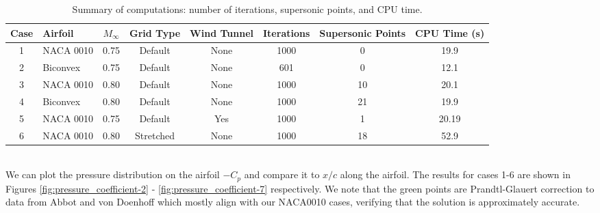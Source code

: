 \documentclass[12pt]{article}
\theoremstyle{definition}
\begin{document}
\begin{table}[h]
    \centering
    \begin{tabular}{c l c c c c c c}
        \hline
        Case & Airfoil & $M_\infty$ & Grid Type & Wind Tunnel & Iterations & Supersonic Points & CPU Time (s) \\
        \hline
        1 & NACA 0010 & 0.75 & Default & None & 1000 & 0 & 19.9 \\
        2 & Biconvex & 0.75 & Default & None & 601 & 0 & 12.1 \\
        3 & NACA 0010 & 0.80 & Default & None & 1000 & 10 & 20.1 \\
        4 & Biconvex & 0.80 & Default & None & 1000 & 21 & 19.9 \\
        5 & NACA 0010 & 0.75 & Default & Yes & 1000 & 1 & 20.19 \\
        6 & NACA 0010 & 0.80 & Stretched & None & 1000 & 18 & 52.9 \\
        \hline
    \end{tabular}
    \caption{Summary of computations: number of iterations, supersonic points, and CPU time.}
    \label{tab:results}
\end{table}

\vspace{1cm}



\\

We can plot the pressure distribution on the airfoil $-C_p$ and compare it to $x/c$ along the airfoil. The results for cases 1-6 are shown in Figures \ref{fig:pressure_coefficient-2} - \ref{fig:pressure_coefficient-7} respectively. We note that the green points are Prandtl-Glauert correction to data from Abbot and von Doenhoff which mostly align with our NACA0010 cases, verifying that the solution is approximately accurate.
\end{document}
